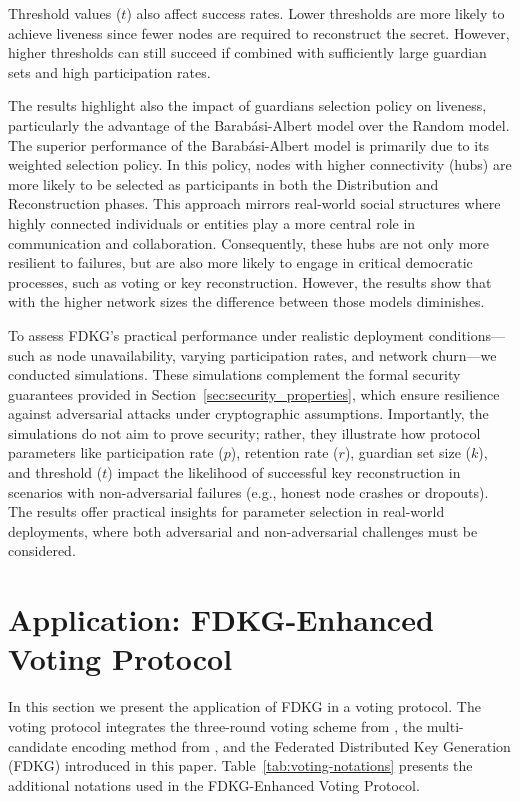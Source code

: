 \documentclass[lettersize,journal]{IEEEtran}
\theoremstyle{definition}
\begin{document}
Threshold values ($t$) also affect success rates. Lower thresholds are more likely to achieve liveness since fewer nodes are required to reconstruct the secret. However, higher thresholds can still succeed if combined with sufficiently large guardian sets and high participation rates.

The results highlight also the impact of guardians selection policy on liveness, particularly the advantage of the Barabási-Albert model over the Random model. The superior performance of the Barabási-Albert model is primarily due to its weighted selection policy. In this policy, nodes with higher connectivity (hubs) are more likely to be selected as participants in both the Distribution and Reconstruction phases. This approach mirrors real-world social structures where highly connected individuals or entities play a more central role in communication and collaboration. Consequently, these hubs are not only more resilient to failures, but are also more likely to engage in critical democratic processes, such as voting or key reconstruction. However, the results show that with the higher network sizes the difference between those models diminishes.

To assess FDKG’s practical performance under realistic deployment conditions---such as node unavailability, varying participation rates, and network churn---we conducted simulations. These simulations complement the formal security guarantees provided in Section~\ref{sec:security_properties}, which ensure resilience against adversarial attacks under cryptographic assumptions. Importantly, the simulations do not aim to prove security; rather, they illustrate how protocol parameters like participation rate (\(p\)), retention rate (\(r\)), guardian set size (\(k\)), and threshold (\(t\)) impact the likelihood of successful key reconstruction in scenarios with non-adversarial failures (e.g., honest node crashes or dropouts). The results offer practical insights for parameter selection in real-world deployments, where both adversarial and non-adversarial challenges must be considered.

\section{Application: FDKG-Enhanced Voting Protocol}\label{sec:voting_scheme}

In this section we present the application of FDKG in a voting protocol. The voting protocol integrates the three-round voting scheme from \cite{schoenmakersLectureNotesCryptographic2018}, the multi-candidate encoding method from \cite{haoAnonymousVotingTworound2010}, and the Federated Distributed Key Generation (FDKG) introduced in this paper. Table~\ref{tab:voting-notations} presents the additional notations used in the FDKG-Enhanced Voting Protocol.
\end{document}
